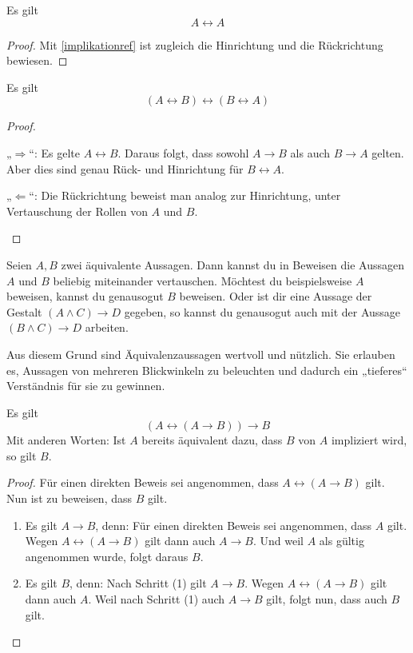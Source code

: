 \begin{satz}\label{iffref}
    Es gilt
        \[ A\leftrightarrow A \]
\end{satz}
\begin{proof}
    Mit \cref{implikationref} ist zugleich die Hinrichtung und die Rückrichtung bewiesen.
\end{proof}


\begin{satz}\label{iffkomm}
    Es gilt
        \[ (A\leftrightarrow B)\leftrightarrow(B\leftrightarrow A) \]
\end{satz}
\begin{proof}
    \begin{labeling}
        \item[„$\Rightarrow$“:] Es gelte $A\leftrightarrow B$. Daraus folgt, dass sowohl $A\to B$ als auch $B\to A$ gelten. Aber dies sind genau Rück- und Hinrichtung für $B\leftrightarrow A$.
        \item[„$\Leftarrow$“:] Die Rückrichtung beweist man analog zur Hinrichtung, unter Vertauschung der Rollen von $A$ und $B$. \qedhere
    \end{labeling}
\end{proof}


\begin{bem}[Substitutionsprinzip] 
    Seien $A,B$ zwei äquivalente Aussagen. Dann kannst du in Beweisen die Aussagen $A$ und $B$ beliebig miteinander vertauschen. Möchtest du beispielsweise $A$ beweisen, kannst du genausogut $B$ beweisen. Oder ist dir eine Aussage der Gestalt $(A\land C)\to D$ gegeben, so kannst du genausogut auch mit der Aussage $(B\land C)\to D$ arbeiten.
    
    Aus diesem Grund sind Äquivalenzaussagen wertvoll und nützlich. Sie erlauben es, Aussagen von mehreren Blickwinkeln zu beleuchten und dadurch ein „tieferes“ Verständnis für sie zu gewinnen.
\end{bem}


\begin{satz} \label{curryparadox}
    Es gilt
        \[ (A\leftrightarrow (A\to B))\to B \]
    Mit anderen Worten: Ist $A$ bereits äquivalent dazu, dass $B$ von $A$ impliziert wird, so gilt $B$.
\end{satz}
\begin{proof}
    Für einen direkten Beweis sei angenommen, dass $A\leftrightarrow (A\to B)$ gilt. Nun ist zu beweisen, dass $B$ gilt.
    \begin{enumerate}[(1)]
        \item Es gilt $A\to B$, denn: Für einen direkten Beweis sei angenommen, dass $A$ gilt. Wegen $A\leftrightarrow (A\to B)$ gilt dann auch $A\to B$. Und weil $A$ als gültig angenommen wurde, folgt daraus $B$.
        \item Es gilt $B$, denn: Nach Schritt (1) gilt $A\to B$. Wegen $A\leftrightarrow (A\to B)$ gilt dann auch $A$. Weil nach Schritt (1) auch $A\to B$ gilt, folgt nun, dass auch $B$ gilt. \qedhere
    \end{enumerate}
\end{proof}


